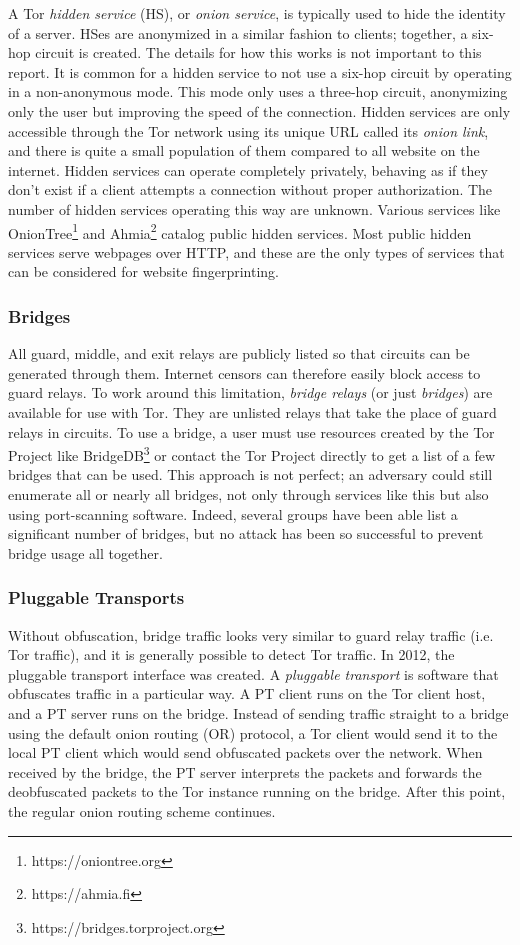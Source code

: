 \documentclass[11pt]{article}
\begin{document}
A Tor \textit{hidden service} (HS), or \textit{onion service}, is typically used to hide the identity of a server. HSes are anonymized in a similar fashion to clients; together, a six-hop circuit is created. The details for how this works is not important to this report. It is common for a hidden service to not use a six-hop circuit by operating in a non-anonymous mode. This mode only uses a three-hop circuit, anonymizing only the user but improving the speed of the connection. Hidden services are only accessible through the Tor network using its unique URL called its \textit{onion link}, and there is quite a small population of them compared to all website on the internet.
Hidden services can operate completely privately, behaving as if they don't exist if a client attempts a connection without proper authorization. The number of hidden services operating this way are unknown.
Various services like OnionTree\footnote{https://oniontree.org} and Ahmia\footnote{https://ahmia.fi} catalog public hidden services. Most public hidden services serve webpages over HTTP, and these are the only types of services that can be considered for website fingerprinting.

\subsubsection{Bridges}
All guard, middle, and exit relays are publicly listed so that circuits can be generated through them. Internet censors can therefore easily block access to guard relays. To work around this limitation, \textit{bridge relays} (or just \textit{bridges}) are available for use with Tor. They are unlisted relays that take the place of guard relays in circuits. To use a bridge, a user must use resources created by the Tor Project like BridgeDB\footnote{https://bridges.torproject.org} or contact the Tor Project directly to get a list of a few bridges that can be used. This approach is not perfect; an adversary could still enumerate all or nearly all bridges, not only through services like this but also using port-scanning software. Indeed, several groups have been able list a significant number of bridges\cite{troncoso}, but no attack has been so successful to prevent bridge usage all together.

\subsubsection{Pluggable Transports}
Without obfuscation, bridge traffic looks very similar to guard relay traffic (i.e. Tor traffic), and it is generally possible to detect Tor traffic.
In 2012, the pluggable transport interface was created. A \textit{pluggable transport} is software that obfuscates traffic in a particular way. A PT client runs on the Tor client host, and a PT server runs on the bridge. Instead of sending traffic straight to a bridge using the default onion routing (OR) protocol, a Tor client would send it to the local PT client which would send obfuscated packets over the network. When received by the bridge, the PT server interprets the packets and forwards the deobfuscated packets to the Tor instance running on the bridge. After this point, the regular onion routing scheme continues.
\end{document}
